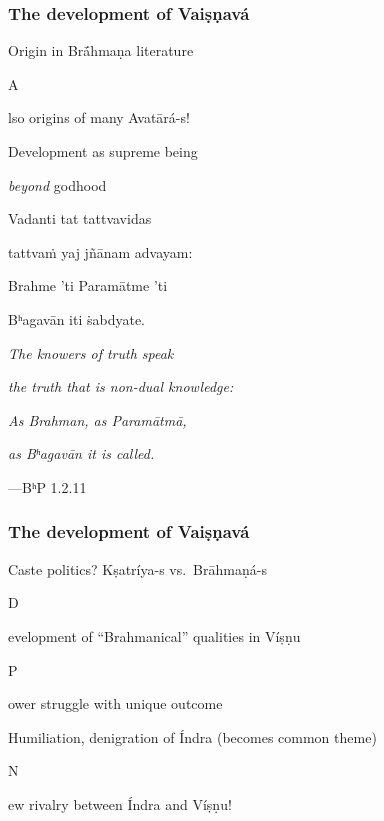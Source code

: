 \documentclass[pdf]{beamer}
\newcommand{\Subitem}[1]{{\setlength\itemindent{12pt} \item[-] #1}}
\begin{document}
\begin{frame} \frametitle{The development of Vaiṣṇavá}
\begin{itemize}
	\item Origin in Brā́hmaṇa literature
	\Subitem Also origins of many Avatārá-s!
	\item Development as supreme being
	\Subitem {\emph{beyond} godhood}
\end{itemize}

\begin{center}
	Vadanti tat tattvavidas

	tattvaṁ yaj jñānam advayam:

	Brahme 'ti Paramātme 'ti

	Bʰagavān iti ṡabdyate.

	\vspace{\baselineskip}

	\textit{The knowers of truth speak}

	\textit{the truth that is non-dual knowledge:}

	\textit{As Brahman, as Paramātmā,}

	\textit{as Bʰagavān it is called.}

	\vspace{\baselineskip}

	---BʰP 1.2.11
\end{center}
\end{frame}

\begin{frame} \frametitle{The development of Vaiṣṇavá}
\begin{itemize}
	\item Caste politics? Kṣatríya-s vs.~Brāhmaṇá-s
	\Subitem Development of ``Brahmanical'' qualities in Víṣṇu
	\Subitem Power struggle with unique outcome
	\item Humiliation, denigration of Índra (becomes common theme)
	\Subitem New rivalry between Índra and Víṣṇu!
\end{itemize}
\end{frame}

\end{document}
